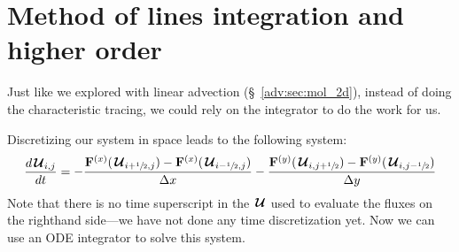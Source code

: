 



\fi


\section{Method of lines integration and higher order}
\label{sec:comp:mol}
Just like we explored with linear advection (\S~\ref{adv:sec:mol_2d}),
instead of doing the characteristic tracing, we could rely on the
integrator to do the work for us.


Discretizing our system in space leads to the following system:
\begin{equation}
\frac{d{\,\boldsymbol{\mathcal{U}}}_{i,j}}{dt} = -\frac{{\bf F}^{(x)}({\,\boldsymbol{\mathcal{U}}}_{i+{\sfrac{1}{2}},j}) - {\bf F}^{(x)}({\,\boldsymbol{\mathcal{U}}}_{i-{\sfrac{1}{2}},j})}{\Delta x}
                      -\frac{{\bf F}^{(y)}({\,\boldsymbol{\mathcal{U}}}_{i,j+{\sfrac{1}{2}}}) - {\bf F}^{(y)}({\,\boldsymbol{\mathcal{U}}}_{i,j-{\sfrac{1}{2}}})}{\Delta y}
\end{equation}
Note that there is no time superscript in the ${\,\boldsymbol{\mathcal{U}}}$ used to evaluate the
fluxes on the righthand side---we have not done any time
discretization yet.  Now we can use an ODE integrator to solve this system.

